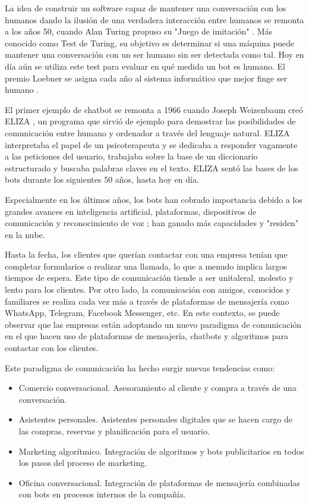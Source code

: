 \newpage

La idea de construir un software capaz de mantener una conversación con los humanos dando la ilusión de una verdadera interacción entre humanos se remonta  a los años 50, cuando Alan Turing propuso su "Juego de imitación" \cite{turing}. Más conocido como Test de Turing, su objetivo es determinar si una máquina puede mantener una conversación con un ser humano sin ser detectada como tal. Hoy en día aún se utiliza este test para evaluar en qué medida un bot es humano. El premio Loebner se asigna cada año al sistema informático que mejor finge ser humano \cite{riseOfBots}.

El primer ejemplo de chatbot se remonta a 1966 cuando Joseph Weizenbaum creó ELIZA \cite{eliza}, un programa que sirvió de ejemplo para demostrar las posibilidades de comunicación entre humano y ordenador a través del lenguaje natural. ELIZA interpretaba el papel de un psicoterapeuta y se dedicaba a responder vagamente a las peticiones del usuario, trabajaba sobre la base de un diccionario estructurado y buscaba palabras claves en el texto. ELIZA sentó las bases de los bots durante los siguientes 50 años, hasta hoy en día.

Especialmente en los últimos años, los bots han cobrado importancia debido a los grandes avances en inteligencia artificial, plataformas, dispositivos de comunicación y reconocimiento de voz \cite{peterAI}; han ganado más capacidades y "residen" en la nube.

Hasta la fecha, los clientes que querían contactar con una empresa tenían que completar formularios o realizar una llamada, lo que a menudo implica largos tiempos de espera. Este tipo de comunicación tiende a ser unitaleral, molesto y lento para los clientes. Por otro lado, la comunicación con amigos, conocidos y familiares se realiza cada vez más a través de plataformas de mensajería como WhatsApp, Telegram, Facebook Messenger, etc. En este contexto, se puede observar que las empresas están adoptando un nuevo paradigma de comunicación en el que hacen uso de plataformas de mensajería, chatbots y algoritmos para contactar con los clientes. 

Este paradigma de comunicación ha hecho surgir nuevas tendencias como:
\begin{itemize}
    \item Comercio conversacional. Asesoramiento al cliente y compra a través de una conversación.
    \item Asistentes personales. Asistentes personales digitales que se hacen cargo de las compras, reservas y planificación para el usuario.
    \item Marketing algorítmico. Integración de algoritmos y bots publicitarios en todos los pasos del proceso de marketing.
    \item Oficina conversacional. Integración de plataformas de mensajería combinadas con bots en procesos internos de la compañía.
\end{itemize}


